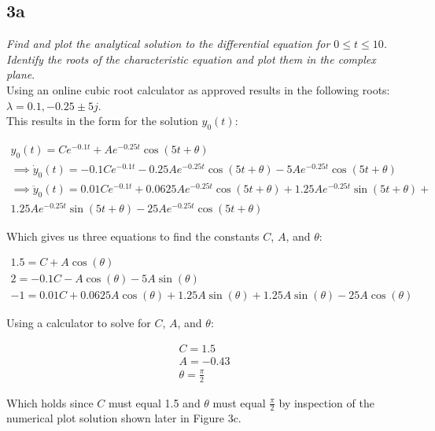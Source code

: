 \documentclass[10pt, AMS Euler]{article}
\begin{document}
\subsection*{3a}

\textit{Find and plot the analytical solution to the differential equation for $0 \le t \le 10$. Identify the roots
of the characteristic equation and plot them in the complex plane}.\\

Using an online cubic root calculator as approved results in the following roots: $\lambda = 0.1, -0.25 \pm 5j$.\\

This results in the form for the solution $y_0(t)$: 
\begin{center}
    \begin{align*}
        y_0(t) = Ce^{-0.1t} + Ae^{-0.25t}\cos{(5t + \theta)}\\
        \implies \dot{y}_0(t) = -0.1Ce^{-0.1t} - 0.25Ae^{-0.25t}\cos{(5t + \theta)} - 5Ae^{-0.25t}\cos{(5t + \theta)}\\
        \implies \ddot{y}_0(t) = 0.01Ce^{-0.1t} + 0.0625Ae^{-0.25t}\cos{(5t + \theta)} + 1.25Ae^{-0.25t}\sin{(5t + \theta)} + \\1.25Ae^{-0.25t}\sin{(5t + \theta)} - 25Ae^{-0.25t}\cos{(5t + \theta)}
    \end{align*}
\end{center}

Which gives us three equations to find the constants $C$, $A$, and $\theta$: 
\begin{center}
    \begin{align*}
        1.5 = C + A\cos{(\theta)}\\
        2 = -0.1C - A\cos{(\theta) - 5A\sin{(\theta)}}\\
        -1 = 0.01C + 0.0625A\cos{(\theta)} + 1.25A\sin{(\theta)} + 1.25A\sin{(\theta)} - 25A\cos{(\theta)}
    \end{align*}
\end{center}

Using a calculator to solve for $C$, $A$, and $\theta$:
\begin{center}
    \begin{align*}
        C = 1.5\\
        A = -0.43\\
        \theta=\frac{\pi}{2}
    \end{align*}
\end{center}

Which holds since $C$ must equal 1.5 and $\theta$ must equal $\frac{\pi}{2}$ by inspection of the numerical plot solution shown later in Figure 3c.
\end{document}
